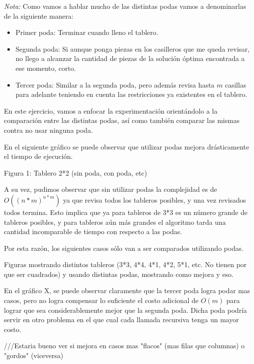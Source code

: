 \emph{Nota:} Como vamos a hablar mucho de las distintas podas vamos a denominarlas de la siguiente manera:
\begin{itemize}
\item Primer poda: Terminar cuando lleno el tablero.
\item Segunda poda: Si aunque ponga piezas en los casilleros que me queda revisar, no llego a alcanzar la cantidad de piezas de la solución óptima encontrada a ese momento, corto.
\item Tercer poda: Similar a la segunda poda, pero además revisa hasta $m$ casillas para adelante teniendo en cuenta las restricciones ya existentes en el tablero.
\end{itemize}

En este ejercicio, vamos a enfocar la experimentación orientándolo a la comparación entre las distintas podas, así como también comparar las mismas contra no usar ninguna poda.

En el siguiente gráfico se puede observar que utilizar podas mejora drásticamente el tiempo de ejecución.

Figura 1: Tablero 2*2 (sin poda, con poda, etc)

A su vez, pudimos observar que sin utilizar podas la complejidad es de $O((n*m)^{n*m})$ ya que revisa todos los tableros posibles, y una vez revisados todos termina. Esto implica que ya para tableros de 3*3 es un número grande de tableros posibles, y para tableros aún más grandes el algoritmo tarda una cantidad incomparable de tiempo con respecto a las podas.

Por esta razón, los siguientes casos sólo van a ser comparados utilizando podas.

Figuras mostrando distintos tableros (3*3, 4*4, 4*1, 4*2, 5*1, etc. No tienen por que ser cuadrados) y usando distintas podas, mostrando como mejora y eso.

En el gráfico X, se puede observar claramente que la tercer poda logra podar mas casos, pero no logra compensar lo suficiente el costo adicional de $O(m)$ para lograr que sea considerablemente mejor que la segunda poda. Dicha poda podría servir en otro problema en el que cual cada llamada recursiva tenga un mayor costo.

///Estaria bueno ver si mejora en casos mas "flacos" (mas filas que columnas) o "gordos" (viceversa)